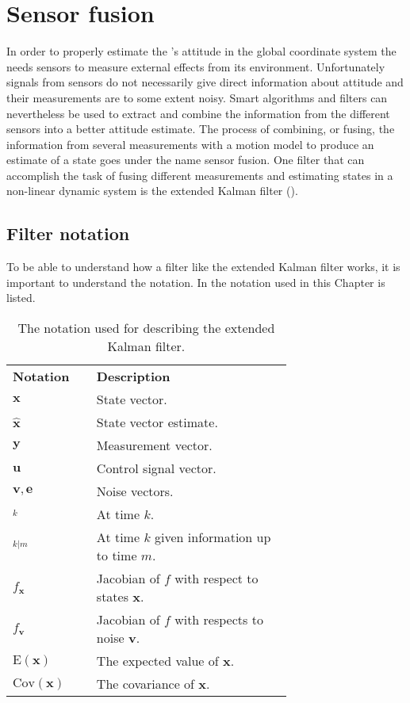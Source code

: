 \chapter{Sensor fusion}\label{cha:sensor_fusion}
In order to properly estimate the \abbrROV's attitude in the global coordinate system the \abbrROV needs sensors to measure external effects from its environment.
Unfortunately signals from sensors do not necessarily give direct information about attitude and their measurements are to some extent noisy. Smart algorithms and filters can nevertheless be used to extract and combine the information from the different sensors into a better attitude estimate. The process of combining, or fusing, the information from several measurements with a motion model to produce an estimate of a state goes under the name sensor fusion. One filter that can accomplish the task of fusing different measurements and estimating states in a non-linear dynamic system is the extended Kalman filter (\abbrEKF). 
\section{Filter notation}
To be able to understand how a filter like the extended Kalman filter works, it is important to understand the notation. In   the notation used in this Chapter is listed.
 \begin{table}[htbp]
  \centering
  \caption{\label{tab:notationKalman}%
    The notation used for describing the extended Kalman filter.}
    \begin{tabular}{l p{0.7\linewidth}}
    \toprule%
    \textbf{Notation} & \textbf{Description} \\
    \otoprule%
    $\boldsymbol{x}$ & State vector.\\
    $\hat{\boldsymbol{x}}$ & State vector estimate.\\
    $\boldsymbol{y}$ & Measurement vector.\\
    $\boldsymbol{u}$ & Control signal vector.\\
    $\boldsymbol{v},\boldsymbol{e}$ & Noise vectors.\\
    $_k$ & At time $k$.\\
    $_{k|m}$ & At time $k$ given information up to time $m$.\\
    $f_{\boldsymbol{x}}$ & Jacobian of $f$ with respect to states $\boldsymbol{x}$.\\
    $f_{\boldsymbol{v}}$ & Jacobian of $f$ with respects to noise $\boldsymbol{v}$.\\
    $\text{E}(\boldsymbol{x})$ & The expected value of $\boldsymbol{x}$.\\
    $\text{Cov}(\boldsymbol{x})$ & The covariance of $\boldsymbol{x}$.\\
    \bottomrule%
 \end{tabular}
\end{table}

